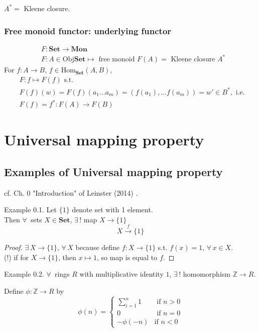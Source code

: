 \documentclass[10pt]{amsart}
\begin{document}
\begin{multicols*}{2}
$A^* = $ Kleene closure.

\subsubsection{Free monoid functor: underlying functor}

\[
\begin{aligned}
& F: \textbf{Set} \to \textbf{Mon} \\
& F: A \in \text{Obj}\textbf{Set} \mapsto \text{ free monoid } F(A) = \text{ Kleene closure } A^* 
\end{aligned}
\]
For $f:A \to B$, $f\in \text{Hom}_{\textbf{Set}}(A, B)$, 
\[
\begin{aligned}
& F: f\mapsto F(f) \text{ s.t. } \\
& F(f)(w) = F(f)(a_1 \dots a_m) = (f(a_1), \dots f(a_m)) = w' \in B^*, \text{ i.e. } \\
& F(f) = f^* : F(A) \to F(B)
\end{aligned}
\]


\section{Universal mapping property}

\subsection{Examples of Universal mapping property}

cf. Ch. 0 "Introduction" of Leinster (2014) \cite{Lein2014}.

Example 0.1. Let $\lbrace 1 \rbrace$ denote set with 1 element. \\
Then $\forall \, $ sets $X \in \textbf{Set}$, $\exists \, ! $ map $X \to \lbrace 1 \rbrace$
\[
X \xrightarrow{ f} \lbrace 1 \rbrace 
\]

\begin{proof}
$\exists \, X \to \lbrace 1 \rbrace$, $\forall \, X$ because define $f: X \to \lbrace 1 \rbrace$ s.t. $f(x) = 1$, $\forall \, x \in X$. \\
(!) if for $X \to \lbrace 1 \rbrace$, then $x\mapsto 1$, so map is equal to $f$.
\end{proof} 

Example 0.2. $\forall \, $ rings $R$ with multiplicative identity $1$, $\exists \, !$ homomorphism $\mathbb{Z} \to R$. \label{Example:integerringhomomorphism}

Define $\phi : \mathbb{Z} \to R$ by 
\[
\phi(n) = \begin{cases}  \sum_{i=1}^n 1 & \text{ if } n > 0 \\ 
0 & \text{ if } n = 0 \\
-\phi(-n) & \text{if } n < 0 \end{cases} 
\]


\end{multicols*}
\end{document}
